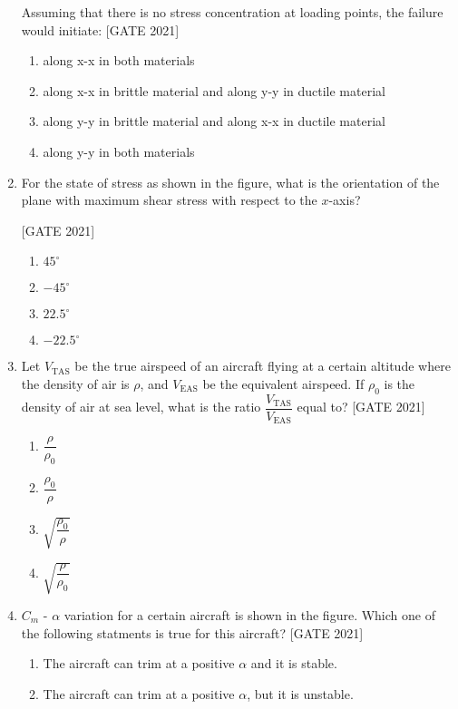 \documentclass[journal,12pt,onecolumn]{IEEEtran}
\theoremstyle{remark}
\begin{document}
\begin{enumerate}
Assuming that there is no stress concentration at loading points, the failure would initiate:
 \hfill{[GATE 2021]}\begin{enumerate}
    \item along x-x in both materials
    \item along x-x in brittle material and along y-y in ductile material
    \item along y-y in brittle material and along x-x in ductile material
    \item along y-y in both materials
\end{enumerate}

\item For the state of stress as shown in the figure, what is the orientation of the plane with maximum shear stress with respect to the $x$-axis?




 \hfill{[GATE 2021]}\begin{multicols}{4}\begin{enumerate}
    \item $45^\circ$
    \item $-45^\circ$
    \item $22.5^\circ$
    \item $-22.5^\circ$
\end{enumerate}
\end{multicols}
\bigskip

\item Let $V_{\text{TAS}}$ be the true airspeed of an aircraft flying at a certain altitude where the density of air is $\rho$, and $V_{\text{EAS}}$ be the equivalent airspeed. If $\rho_0$ is the density of air at sea level, what is the ratio $ \dfrac{V_{\text{TAS}}}{V_{\text{EAS}}}$ equal to?
 \hfill{[GATE 2021]}\begin{multicols}{4}\begin{enumerate}
    \item $ \dfrac{\rho}{\rho_0}$
    \item $ \dfrac{\rho_0}{\rho}$
    \item $\sqrt{ \dfrac{\rho_0}{\rho}}$
    \item $\sqrt{ \dfrac{\rho}{\rho_0}}$
\end{enumerate}
\end{multicols}
\item $C_{m}$ - $\alpha$ variation for a certain aircraft is shown in the figure. Which one of the following statments is true for this aircraft?
 \hfill{[GATE 2021]}
 
 \begin{enumerate}
\item The aircraft can trim at a positive $\alpha$ and it is stable. 
\item The aircraft can trim at a positive $\alpha$, but it is unstable.


\end{enumerate}
\end{enumerate}
\end{document}
